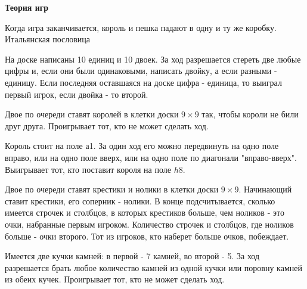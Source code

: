 \centerline{\bf \Huge Теория игр}

\begin{flushright}
        \scriptsize{Когда игра заканчивается, король и пешка падают в одну и ту же коробку.\\ Итальянская пословица}
\end{flushright}

На доске написаны 10 единиц и 10 двоек. За ход разрешается стереть две любые цифры и, если они были одинаковыми, написать двойку, а если разными - единицу. Если последняя оставшаяся на доске цифра - единица, то выиграл первый игрок, если двойка - то второй.

Двое по очереди ставят королей в клетки доски $9 \times 9$ так, чтобы короли не били друг друга. Проигрывает тот, кто не может сделать ход.

Король стоит на поле а1. За один ход его можно передвинуть на одно поле вправо, или на одно поле вверх, или на одно поле по диагонали "вправо-вверх". Выигрывает тот, кто поставит короля на поле $h 8$.

Двое по очереди ставят крестики и нолики в клетки доски $9 \times 9$. Начинающий ставит крестики, его соперник - нолики. В конце подсчитывается, сколько имеется строчек и столбцов, в которых крестиков больше, чем ноликов - это очки, набранные первым игроком. Количество строчек и столбцов, где ноликов больше - очки второго. Тот из игроков, кто наберет больше очков, побеждает.

Имеется две кучки камней: в первой - 7 камней, во второй - 5. За ход разрешается брать любое количество камней из одной кучки или поровну камней из обеих кучек. Проигрывает тот, кто не может сделать ход.
